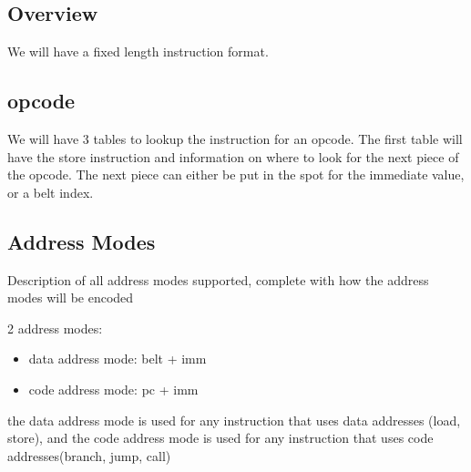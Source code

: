 \documentclass{article}
\begin{document}




	\subsection{Overview}
		We will have a fixed length instruction format.

	\subsection{opcode}
		We will have 3 tables to lookup the instruction for an opcode.
		The first table will have the store instruction and information on where to look for the next piece of the opcode.
		The next piece can either be put in the spot for the immediate value, or a belt index.


	\subsection{Address Modes}
		Description of all address modes supported, complete with how the address modes will be encoded

		2 address modes:
		\begin{itemize}
			\item data address mode: belt + imm
			\item code address mode: pc + imm
		\end{itemize}
		the data address mode is used for any instruction that uses data addresses (load, store), and the code address mode is used for any instruction that uses code addresses(branch, jump, call)
\end{document}
